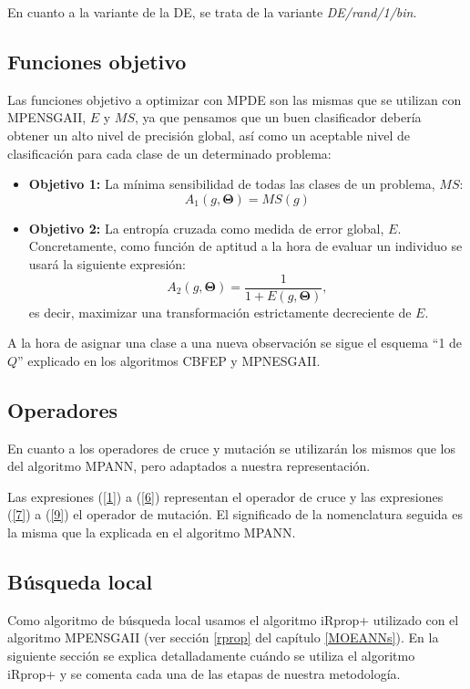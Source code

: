 En cuanto a la variante de la DE, se trata de la variante \textit{DE/rand/1/bin}.
\newpage
\subsection{Funciones objetivo}
\indent Las funciones objetivo a optimizar con MPDE son las mismas que se utilizan con
MPENSGAII, $E$ y $MS$, ya que pensamos que un buen
clasificador
debería obtener un alto nivel de
precisión global, así como un aceptable nivel de clasificación para cada clase de un determinado
problema:
\begin{itemize}
\item \textbf{Objetivo 1:} La mínima sensibilidad de todas las clases de un problema, $MS$:
\begin{displaymath}
A_{1}\left( g,\mathbf{\Theta}\right) = MS(g)
\end{displaymath}
\item \textbf{Objetivo 2:} La entropía cruzada como medida de error global, $E$. Concretamente, como
función
de aptitud a la hora de evaluar un individuo se usará la siguiente expresión:
\begin{displaymath}
\label{aptitudNNEP}
A_{2}\left( g,\mathbf{\Theta}\right) =\frac{1}{1+E\left( g,\mathbf{\Theta}\right)},
\end{displaymath}
es decir, maximizar una transformación estrictamente decreciente de $E$.
\end{itemize}

A la hora de asignar una clase a una nueva observación se sigue el esquema ``1 de $Q$''
explicado en los algoritmos CBFEP y MPNESGAII.

\subsection{Operadores}
\noindent En cuanto a los operadores de cruce y mutación se utilizarán los mismos que los
del algoritmo MPANN, pero adaptados a nuestra representación.

Las expresiones (\ref{1}) a (\ref{6})
representan el operador de cruce y las expresiones (\ref{7}) a (\ref{9}) el
operador de mutación. El significado de la nomenclatura seguida es la misma que la
explicada en el algoritmo MPANN.

\subsection{Búsqueda local}
\noindent Como algoritmo de búsqueda local usamos el algoritmo iRprop+ utilizado con el
algoritmo MPENSGAII (ver sección \ref{rprop} del capítulo \ref{MOEANNs}). En la siguiente
sección se explica detalladamente cuándo se utiliza el algoritmo iRprop+ y se comenta
cada una de las etapas de nuestra metodología.

